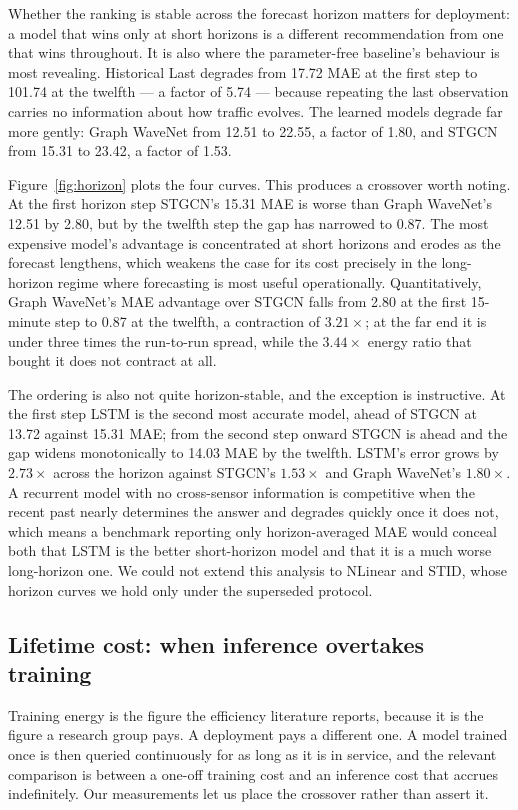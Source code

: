 \documentclass[manuscript,screen,review]{acmart}
\begin{document}
Whether the ranking is stable across the forecast horizon matters for
deployment: a model that wins only at short horizons is a different
recommendation from one that wins throughout. It is also where the
parameter-free baseline's behaviour is most revealing. Historical Last
degrades from 17.72 MAE at the first step to 101.74 at the twelfth --- a
factor of 5.74 --- because repeating the last observation carries no
information about how traffic evolves. The learned models degrade far more
gently: Graph WaveNet from 12.51 to 22.55, a factor of 1.80, and STGCN from
15.31 to 23.42, a factor of 1.53.

Figure~\ref{fig:horizon} plots the four curves. This produces a crossover
worth noting. At the first horizon step STGCN's
15.31 MAE is worse than Graph WaveNet's 12.51 by 2.80, but by the twelfth step
the gap has narrowed to 0.87. The most expensive model's advantage is
concentrated at short horizons and erodes as the forecast lengthens, which
weakens the case for its cost precisely in the long-horizon regime where
forecasting is most useful operationally. Quantitatively, Graph WaveNet's MAE
advantage over STGCN falls from 2.80 at the first 15-minute step to 0.87 at
the twelfth, a contraction of $3.21\times$; at the far end it is under three
times the run-to-run spread, while the $3.44\times$ energy ratio that bought
it does not contract at all.

The ordering is also not quite horizon-stable, and the exception is
instructive. At the first step LSTM is the second most accurate model, ahead
of STGCN at 13.72 against 15.31 MAE; from the second step onward STGCN is
ahead and the gap widens monotonically to 14.03 MAE by the twelfth. LSTM's
error grows by $2.73\times$ across the horizon against STGCN's $1.53\times$
and Graph WaveNet's $1.80\times$. A recurrent model with no cross-sensor
information is competitive when the recent past nearly determines the answer
and degrades quickly once it does not, which means a benchmark reporting only
horizon-averaged MAE would conceal both that LSTM is the better short-horizon
model and that it is a much worse long-horizon one. We could not extend this
analysis to NLinear and STID, whose horizon curves we hold only under the
superseded protocol.

\subsection{Lifetime cost: when inference overtakes training}
\label{sec:lifetime}
Training energy is the figure the efficiency literature reports, because it is
the figure a research group pays. A deployment pays a different one. A model
trained once is then queried continuously for as long as it is in service, and
the relevant comparison is between a one-off training cost and an inference
cost that accrues indefinitely. Our measurements let us place the crossover
rather than assert it.
\end{document}
